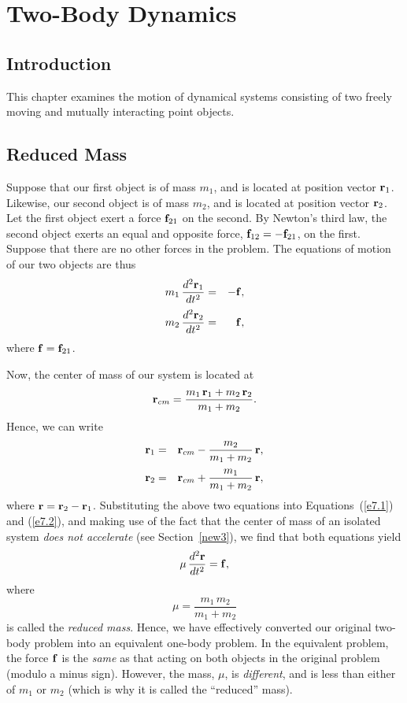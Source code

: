 \chapter{Two-Body Dynamics}\label{ctwo}
\section{Introduction}
This chapter examines the motion of dynamical systems consisting
of two freely moving and mutually interacting  point objects. 

\section{Reduced Mass}\label{sredm}
Suppose that our first object is of mass $m_1$, and is located
at position vector ${\bf r}_1$. Likewise, our second object
is of mass $m_2$, and is located at position vector ${\bf r}_2$. 
Let the first object exert a force ${\bf f}_{21}$ on the
second. By Newton's third law, the second object exerts an
equal and opposite force, ${\bf f}_{12} = -{\bf f}_{21}$, on the 
first. Suppose that there are no other forces in the problem. The equations of motion of our two objects are thus
\begin{eqnarray}\label{e7.1}
m_1\,\frac{d^2{\bf r}_1}{dt^2} &=& -{\bf f},\\[0.5ex]
m_2\,\frac{d^2{\bf r}_2}{dt^2} &=&{\bf f},\label{e7.2}
\end{eqnarray}
where ${\bf f} = {\bf f}_{21}$. 

Now, the center of mass of our system is located at
\begin{equation}
{\bf r}_{cm} = \frac{m_1\,{\bf r}_1+ m_2\,{\bf r}_2}{m_1 + m_2}.
\end{equation}
Hence, we can write
\begin{eqnarray}
{\bf r}_1 &=& {\bf r}_{cm} - \frac{m_2}{m_1+m_2}\,{\bf r},\\[0.5ex]
{\bf r}_2 &=& {\bf r}_{cm} + \frac{m_1}{m_1+m_2}\,{\bf r},
\end{eqnarray}
where ${\bf r}= {\bf r}_2-{\bf r}_1$. 
Substituting the above two equations into Equations~(\ref{e7.1}) and (\ref{e7.2}),
and making use of the fact that the center of mass of an isolated system
{\em does not accelerate}\/ (see Section~\ref{new3}), we find that both equations yield
\begin{equation}\label{e7.6}
\mu\,\frac{d^2{\bf r}}{d t^2} = {\bf f},
\end{equation}
where 
\begin{equation}
\mu = \frac{m_1\,m_2}{m_1+ m_2}
\end{equation}
is called the {\em reduced mass}. Hence, we have effectively converted our
original two-body problem into an equivalent one-body problem. In the equivalent problem, the
force ${\bf f}$ is the {\em same}\/ as that acting on both objects  in the original problem (modulo a minus sign). However, the mass, $\mu$, is {\em different}, and
is less than either of $m_1$ or $m_2$ (which is why it is called the ``reduced'' mass). 

